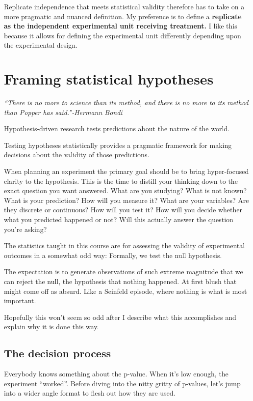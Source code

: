 \documentclass[]{book}
\begin{document}
Replicate independence that meets statistical validity therefore has to take on a more pragmatic and nuanced definition. My preference is to define a \textbf{replicate as the independent experimental unit receiving treatment.} I like this because it allows for defining the experimental unit differently depending upon the experimental design.

\hypertarget{hypotheses}{%
\chapter{Framing statistical hypotheses}\label{hypotheses}}

\emph{``There is no more to science than its method, and there is no more to its method than Popper has said.''-Hermann Bondi}

Hypothesis-driven research tests predictions about the nature of the world.

Testing hypotheses statistically provides a pragmatic framework for making decisions about the validity of those predictions.

When planning an experiment the primary goal should be to bring hyper-focused clarity to the hypothesis. This is the time to distill your thinking down to the exact question you want answered. What are you studying? What is not known? What is your prediction? How will you measure it? What are your variables? Are they discrete or continuous? How will you test it? How will you decide whether what you predicted happened or not? Will this actually answer the question you're asking?

The statistics taught in this course are for assessing the validity of experimental outcomes in a somewhat odd way: Formally, we test the null hypothesis.

The expectation is to generate observations of such extreme magnitude that we can reject the null, the hypothesis that nothing happened. At first blush that might come off as absurd. Like a Seinfeld episode, where nothing is what is most important.

Hopefully this won't seem so odd after I describe what this accomplishes and explain why it is done this way.

\hypertarget{the-decision-process}{%
\section{The decision process}\label{the-decision-process}}

Everybody knows something about the p-value. When it's low enough, the experiment ``worked''. Before diving into the nitty gritty of p-values, let's jump into a wider angle format to flesh out how they are used.
\end{document}
